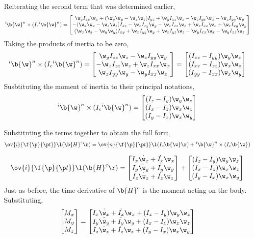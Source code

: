 \documentclass[a4paper, 12pt]{report}
\begin{document}
\begin{center}
Reiterating the second term that was determined earlier,
$${}^i\b{\w}^n\times (I_c {}^i\b{\w}^n) = \begin{bmatrix}
\w_yI_{zx}\w_x + (\w_y\w_y - \w_z\w_z)I_{yz} + \w_yI_{zz}\w_z - \w_zI_{yx}\w_x - \w_zI_{yy}\w_y \\
-(\w_x\w_x - \w_z\w_z)I_{xz} - \w_xI_{zy}\w_y - \w_xI_{zz}\w_z + \w_zI_{xx}\w_x + \w_zI_{xy}\w_y \\
(\w_x\w_x - \w_y\w_y)I_{xy} + \w_xI_{yy}\w_y + \w_xI_{yz}\w_z - \w_yI_{xx}\w_x  - \w_yI_{xz}\w_z
\end{bmatrix}$$
Taking the products of inertia to be zero,
$${}^i\b{\w}^n\times (I_c {}^i\b{\w}^n) = \begin{bmatrix}
\w_yI_{zz}\w_z - \w_zI_{yy}\w_y \\
 - \w_xI_{zz}\w_z + \w_zI_{xx}\w_x \\
\w_xI_{yy}\w_y - \w_yI_{xx}\w_x
\end{bmatrix} = \begin{bmatrix}
(I_{zz} - I_{yy})\w_y\w_z \\
(I_{xx} - I_{zz})\w_x\w_z \\
(I_{yy} - I_{xx})\w_x\w_y
\end{bmatrix}$$ 
Susbtituting the moment of inertia to their principal notations,
$${}^i\b{\w}^n\times (I_c {}^i\b{\w}^n)= \begin{bmatrix}
(I_{z} - I_{y})\w_y\w_z \\
(I_{x} - I_{z})\w_x\w_z \\
(I_{y} - I_{x})\w_x\w_y
\end{bmatrix}$$

Substituting the terms together to obtain the full form,
$$\ov{i}{\f{\p}{\p t}}\l(\b{H}^c\r) = \ov{n}{\f{\p}{\p t}}\l(I_c \b{\w}\r) + {}^i\b{\w}^n\times (I_c \b{\w})$$

$$\ov{i}{\f{\p}{\p t}}\l(\b{H}^c\r) = 
\begin{bmatrix}
I_x\dot{\w_x}+\dot{I_x}\w_x \\
I_y\dot{\w_y}+\dot{I_y}\w_y \\
I_z\dot{\w_z}+\dot{I_z}\w_z
\end{bmatrix} + \begin{bmatrix}
(I_{z} - I_{y})\w_y\w_z \\
(I_{x} - I_{z})\w_x\w_z \\
(I_{y} - I_{x})\w_x\w_y
\end{bmatrix}$$
Just as before, the time derivative of $\b{H}^c$ is the moment acting on the body. Substituting,
$$\begin{bmatrix}
M_x \\ M_y \\ M_z
\end{bmatrix} = \begin{bmatrix}
I_x\dot{\w_x}+\dot{I_x}\w_x + (I_{z} - I_{y})\w_y\w_z\\
I_y\dot{\w_y}+\dot{I_y}\w_y + (I_{x} - I_{z})\w_x\w_z\\
I_z\dot{\w_z}+\dot{I_z}\w_z + (I_{y} - I_{x})\w_x\w_y
\end{bmatrix}$$









\end{center}
\end{document}
